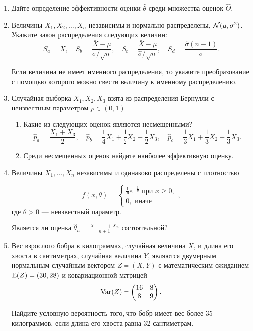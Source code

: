 \begin{enumerate}
  
\item Дайте определение эффективности оценки $\hat \theta$ среди множества оценок $\hat \Theta$.
  
  \item Величины $X_1, X_2, \dots, X_n$ независимы и нормально распределены, $\mathcal{N}(\mu, \sigma^2)$. 
  Укажите закон распределения следующих величин:
  \[
  S_a = \bar X, \quad S_b = \frac{\bar X - \mu}{\sigma / \sqrt{n}}, \quad S_c = \frac{\bar X - \mu}{\hat \sigma / \sqrt{n}}, \quad S_d = \frac{\hat \sigma (n-1)}{\sigma}.  
  \]
  
  Если величина не имеет именного распределения, то укажите преобразование с помощью которого можно свести величину к именному распределению. 
  
  \item Случайная выборка  $X_1, X_2, X_3$ взята из распределения Бернулли с неизвестным параметром $p \in (0, 1)$. 

  \begin{enumerate}
    \item   Какие из следующих оценок являются несмещенными?   
    \[
      \hat p_a = \frac{X_1 + X_3}{2}, \quad \hat p_b = \frac{1}{4}X_1 + \frac{1}{2}X_2 + \frac{1}{2}X_3, \quad \hat p_c =  \frac{1}{3}X_1 + \frac{1}{3}X_2 + \frac{1}{3}X_3.
    \]
  \item Среди несмещенных оценок найдите наиболее эффективную оценку.
  \end{enumerate}
  
  \item Величины $X_1, \dots, X_n$ независимы и одинаково распределены с плотностью
  
  \[
  f(x, \theta) = 
   \begin{cases}
     \frac{1}{\theta}e^{-\frac{1}{\theta}} \text{ при }x \geq 0,\\
     0, \text{ иначе}
   \end{cases},
  \]
  где $\theta > 0$ — неизвестный параметр. 
  
  Является ли оценка $\hat \theta_n = \frac{X_1 + \dots + X_n}{n+1}$ состоятельной?
  
  \item Вес взрослого бобра в килограммах, случайная величина $X$, и длина его хвоста в сантиметрах, случайная величина $Y$, 
  являются двумерным нормальным случайным вектором $Z = (X, Y)$ 
  с математическим ожиданием $\operatorname{\mathbb{E}}(Z) = (30, 28)$ и ковариационной матрицей
  \[
  \operatorname{Var}(Z) = \begin{pmatrix}
    16 & 8\\
    8 & 9
  \end{pmatrix}.
  \]
  
  Найдите условную вероятность того, что бобр имеет вес более 35 килограммов, если длина его хвоста равна 32 сантиметрам.
  
  \end{enumerate}
  



